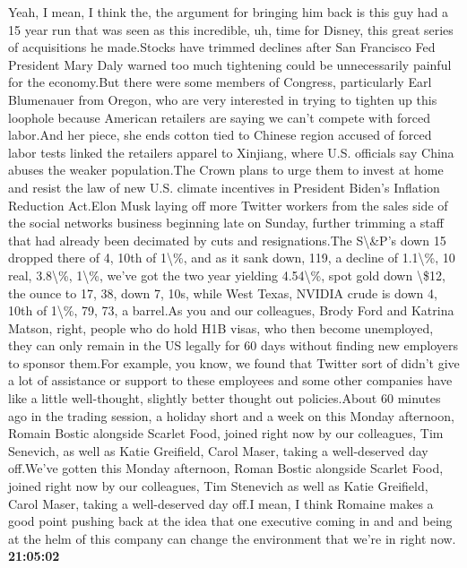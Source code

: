 \documentclass{article}%
\begin{document}
Yeah, I mean, I think the, the argument for bringing him back is this guy had a 15 year run that was seen as this incredible, uh, time for Disney, this great series of acquisitions he made.Stocks have trimmed declines after San Francisco Fed President Mary Daly warned too much tightening could be unnecessarily painful for the economy.But there were some members of Congress, particularly Earl Blumenauer from Oregon, who are very interested in trying to tighten up this loophole because American retailers are saying we can't compete with forced labor.And her piece, she ends cotton tied to Chinese region accused of forced labor tests linked the retailers apparel to Xinjiang, where U.S. officials say China abuses the weaker population.The Crown plans to urge them to invest at home and resist the law of new U.S. climate incentives in President Biden's Inflation Reduction Act.Elon Musk laying off more Twitter workers from the sales side of the social networks business beginning late on Sunday, further trimming a staff that had already been decimated by cuts and resignations.The S\textbackslash{}\&P's down 15 dropped there of 4, 10th of 1\textbackslash{}\%, and as it sank down, 119, a decline of 1.1\textbackslash{}\%, 10 real, 3.8\textbackslash{}\%, 1\textbackslash{}\%, we've got the two year yielding 4.54\textbackslash{}\%, spot gold down \textbackslash{}\$12, the ounce to 17, 38, down 7, 10s, while West Texas, NVIDIA crude is down 4, 10th of 1\textbackslash{}\%, 79, 73, a barrel.As you and our colleagues, Brody Ford and Katrina Matson, right, people who do hold H1B visas, who then become unemployed, they can only remain in the US legally for 60 days without finding new employers to sponsor them.For example, you know, we found that Twitter sort of didn't give a lot of assistance or support to these employees and some other companies have like a little well{-}thought, slightly better thought out policies.About 60 minutes ago in the trading session, a holiday short and a week on this Monday afternoon, Romain Bostic alongside Scarlet Food, joined right now by our colleagues, Tim Senevich, as well as Katie Greifield, Carol Maser, taking a well{-}deserved day off.We've gotten this Monday afternoon, Roman Bostic alongside Scarlet Food, joined right now by our colleagues, Tim Stenevich as well as Katie Greifield, Carol Maser, taking a well{-}deserved day off.I mean, I think Romaine makes a good point pushing back at the idea that one executive coming in and and being at the helm of this company can change the environment that we're in right now.%
\textbf{21:05:02}%
\newline%
\end{document}
